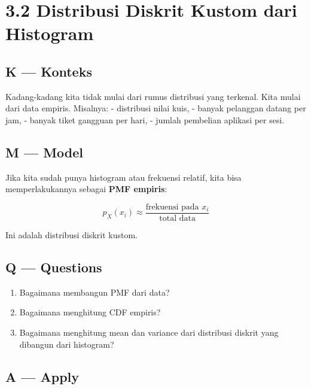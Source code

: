 \documentclass[
  letterpaper,
  DIV=11,
  numbers=noendperiod]{scrreprt}
\providecommand{\tightlist}{%
  \setlength{\itemsep}{0pt}\setlength{\parskip}{0pt}}
\begin{document}
\section{3.2 Distribusi Diskrit Kustom dari
Histogram}\label{distribusi-diskrit-kustom-dari-histogram}

\subsection{K --- Konteks}\label{k-konteks-10}

Kadang-kadang kita tidak mulai dari rumus distribusi yang terkenal. Kita
mulai dari data empiris. Misalnya: - distribusi nilai kuis, - banyak
pelanggan datang per jam, - banyak tiket gangguan per hari, - jumlah
pembelian aplikasi per sesi.

\subsection{M --- Model}\label{m-model-10}

Jika kita sudah punya histogram atau frekuensi relatif, kita bisa
memperlakukannya sebagai \textbf{PMF empiris}:

\[
p_X(x_i) \approx \frac{\text{frekuensi pada } x_i}{\text{total data}}
\]

Ini adalah distribusi diskrit kustom.

\subsection{Q --- Questions}\label{q-questions-10}

\begin{enumerate}
\def\labelenumi{\arabic{enumi}.}
\tightlist
\item
  Bagaimana membangun PMF dari data?
\item
  Bagaimana menghitung CDF empiris?
\item
  Bagaimana menghitung mean dan variance dari distribusi diskrit yang
  dibangun dari histogram?
\end{enumerate}

\subsection{A --- Apply}\label{a-apply-10}
\end{document}
